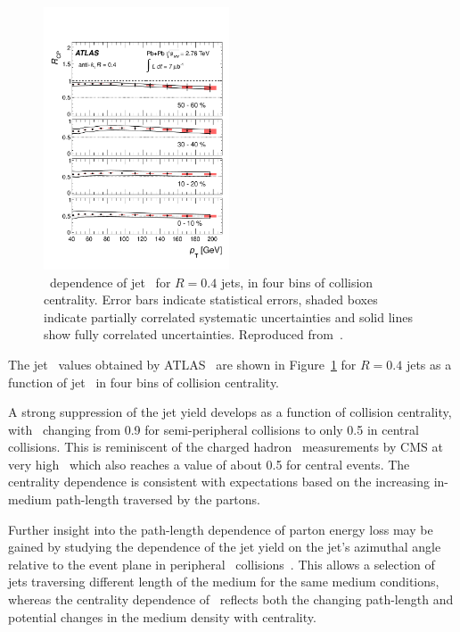 \begin{figure}[!th]
\begin{center}
\includegraphics[width=0.49\textwidth]{jetfigures/ATLAS_jetRCP_04.pdf}
\caption{
\pT\ dependence of jet \Rcp\ for  $R=0.4$ jets,
in four bins of collision centrality. Error bars indicate
statistical errors,  shaded boxes indicate partially 
correlated systematic uncertainties and
solid lines show fully correlated uncertainties. Reproduced from~\cite{Aad:2012is}.}
\label{fig:GR:rcprfour}
\end{center}
\end{figure}
The jet \Rcp\ values obtained by ATLAS~\cite{Aad:2012is} are shown in Figure~\ref{fig:GR:rcprfour}
for $R=0.4$ jets as a function of jet \pT\ in four bins of collision centrality.

A strong suppression of the jet yield develops as a function
of collision centrality, with \Rcp\ changing from 0.9 for semi-peripheral
collisions to only 0.5 in central collisions.  This is reminiscent
of the charged hadron \Raa\ measurements by CMS at very high \pT\, which 
also reaches a value of about 0.5 for central events.
The centrality dependence is consistent with expectations based on the increasing 
in-medium path-length traversed by the partons. 

Further insight into the path-length dependence of parton energy
loss may be gained by studying the dependence of the jet yield
on the jet's azimuthal angle relative to the event plane
in peripheral \PbPb\ collisions~\cite{Aad:2013sla}. This allows a selection of jets
traversing different length of the medium for the same medium
conditions, whereas the centrality dependence of \Rcp\ reflects
both the changing path-length and potential changes in the medium
density with centrality.

